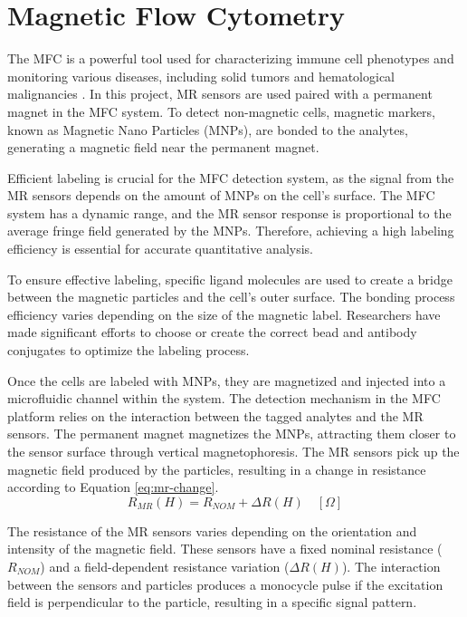 
\section{Magnetic Flow Cytometry}
\label{sec:mfc}

The MFC is a powerful tool used for characterizing immune cell phenotypes and monitoring various diseases, including solid tumors and hematological malignancies \cite{cpim.40}. In this project, MR sensors are used paired with a permanent magnet in the MFC system. To detect non-magnetic cells, magnetic markers, known as Magnetic Nano Particles (MNPs), are bonded to the analytes, generating a magnetic field near the permanent magnet.

Efficient labeling is crucial for the MFC detection system, as the signal from the MR sensors depends on the amount of MNPs on the cell's surface. The MFC system has a dynamic range, and the MR sensor response is proportional to the average fringe field generated by the MNPs. Therefore, achieving a high labeling efficiency is essential for accurate quantitative analysis.

To ensure effective labeling, specific ligand molecules \cite{Freitas2017SpintronicBF} are used to create a bridge between the magnetic particles and the cell's outer surface. The bonding process efficiency varies depending on the size of the magnetic label. Researchers have made significant efforts to choose or create the correct bead and antibody conjugates to optimize the labeling process.

Once the cells are labeled with MNPs, they are magnetized and injected into a microfluidic channel within the system. The detection mechanism in the MFC platform relies on the interaction between the tagged analytes and the MR sensors. The permanent magnet magnetizes the MNPs, attracting them closer to the sensor surface through vertical magnetophoresis. The MR sensors pick up the magnetic field \cite{DiogoC_thesis} produced by the particles, resulting in a change in resistance according to Equation \ref{eq:mr-change}.
\begin{equation}
\label{eq:mr-change}
    R_{MR}(H) = R_{NOM} + \Delta R(H) \quad [\Omega]
\end{equation}

The resistance of the MR sensors varies depending on the orientation and intensity of the magnetic field. These sensors have a fixed nominal resistance ($R_{NOM}$) and a field-dependent resistance variation ($\Delta R(H)$). The interaction between the sensors and particles produces a monocycle pulse if the excitation field is perpendicular to the particle, resulting in a specific signal pattern.